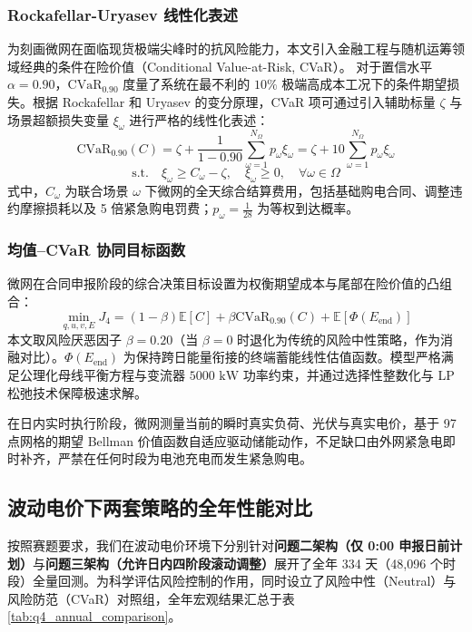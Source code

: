 \documentclass[withoutpreface]{cumcmthesis}
\begin{document}
\subsubsection{Rockafellar-Uryasev 线性化表述}
为刻画微网在面临现货极端尖峰时的抗风险能力，本文引入金融工程与随机运筹领域经典的条件在险价值（Conditional Value-at-Risk, CVaR）。
对于置信水平 $\alpha = 0.90$，$\text{CVaR}_{0.90}$ 度量了系统在最不利的 $10\%$ 极端高成本工况下的条件期望损失。根据 Rockafellar 和 Uryasev 的变分原理，CVaR 项可通过引入辅助标量 $\zeta$ 与场景超额损失变量 $\xi_\omega$ 进行严格的线性化表述：
\begin{equation}
    \text{CVaR}_{0.90}(C) = \zeta + \frac{1}{1 - 0.90} \sum_{\omega=1}^{N_\Omega} p_\omega \xi_\omega = \zeta + 10 \sum_{\omega=1}^{N_\Omega} p_\omega \xi_\omega \label{eq:q4_cvar_def}
\end{equation}
\begin{equation}
    \text{s.t.} \quad \xi_\omega \ge C_\omega - \zeta, \quad \xi_\omega \ge 0, \quad \forall \omega \in \Omega
\end{equation}
式中，$C_\omega$ 为联合场景 $\omega$ 下微网的全天综合结算费用，包括基础购电合同、调整违约摩擦损耗以及 5 倍紧急购电罚费；$p_\omega = \frac{1}{28}$ 为等权到达概率。

\subsubsection{均值--CVaR 协同目标函数}
微网在合同申报阶段的综合决策目标设置为权衡期望成本与尾部在险价值的凸组合：
\begin{equation}
    \min_{q, u, v, E} J_4 = (1 - \beta) \mathbb{E}[C] + \beta \text{CVaR}_{0.90}(C) + \mathbb{E}[\Phi(E_{\text{end}})] \label{eq:q4_obj}
\end{equation}
本文取风险厌恶因子 $\beta = 0.20$（当 $\beta = 0$ 时退化为传统的风险中性策略，作为消融对比）。$\Phi(E_{\text{end}})$ 为保持跨日能量衔接的终端蓄能线性估值函数。模型严格满足公理化母线平衡方程与变流器 $5000\text{ kW}$ 功率约束，并通过选择性整数化与 LP 松弛技术保障极速求解。

在日内实时执行阶段，微网测量当前的瞬时真实负荷、光伏与真实电价，基于 97 点网格的期望 Bellman 价值函数自适应驱动储能动作，不足缺口由外网紧急电即时补齐，严禁在任何时段为电池充电而发生紧急购电。

\subsection{波动电价下两套策略的全年性能对比}
按照赛题要求，我们在波动电价环境下分别针对\textbf{问题二架构（仅 0:00 申报日前计划）}与\textbf{问题三架构（允许日内四阶段滚动调整）}展开了全年 334 天（48,096 个时段）全量回测。为科学评估风险控制的作用，同时设立了风险中性（Neutral）与风险防范（CVaR）对照组，全年宏观结果汇总于表 \ref{tab:q4_annual_comparison}。
\end{document}
